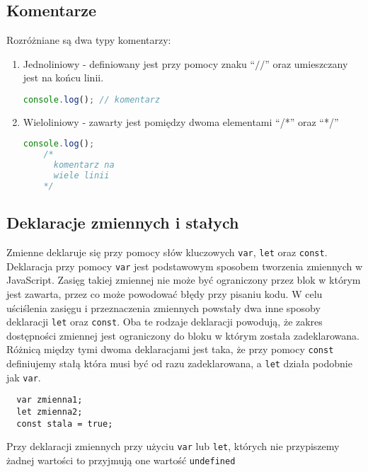 \subsection{Komentarze}

\par Rozróżniane są dwa typy komentarzy:
\begin{enumerate}
  \item Jednoliniowy - definiowany jest przy pomocy znaku ``$//$'' oraz umieszczany jest na końcu linii.
  \begin{lstlisting}[language=JavaScript, caption=Przykład komentarza jednoliniowego, label=alg:kod1]
    console.log(); // komentarz
  \end{lstlisting}
  \item Wieloliniowy - zawarty jest pomiędzy dwoma elementami ``/*'' oraz ``*/''
  \begin{lstlisting}[language=JavaScript, caption=Przykład komentarza wieloliniowego, label=alg:kod2]
    console.log();
    /*
      komentarz na
      wiele linii
    */
  \end{lstlisting}
\end{enumerate}

\subsection{Deklaracje zmiennych i stałych}
\par Zmienne deklaruje się przy pomocy słów kluczowych \texttt{var}, \texttt{let} oraz \texttt{const}. Deklaracja przy pomocy \texttt{var} jest podstawowym sposobem tworzenia zmiennych w JavaScript. Zasięg takiej zmiennej nie może być ograniczony przez blok w którym jest zawarta, przez co może powodować błędy przy pisaniu kodu. W celu uściślenia zasięgu i przeznaczenia zmiennych powstały dwa inne sposoby deklaracji \texttt{let} oraz \texttt{const}. Oba te rodzaje deklaracji powodują, że zakres dostępności zmiennej jest ograniczony do bloku w którym została zadeklarowana. Różnicą między tymi dwoma deklaracjami jest taka, że przy pomocy \texttt{const} definiujemy stałą która musi być od razu zadeklarowana, a \texttt{let} działa podobnie jak \texttt{var}.
\begin{lstlisting}
  var zmienna1;
  let zmienna2;
  const stala = true;
\end{lstlisting}
\par Przy deklaracji zmiennych przy użyciu \texttt{var} lub \texttt{let}, których nie przypiszemy żadnej wartości to przyjmują one wartość \texttt{undefined}

